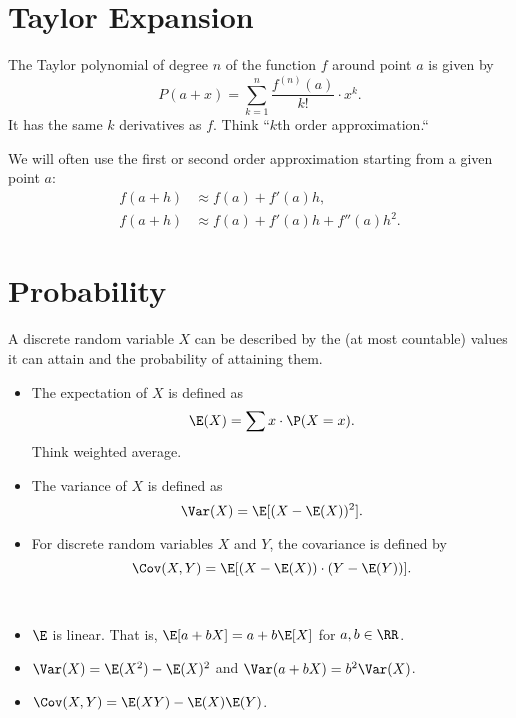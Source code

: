 \documentclass[oneside,reqno,letterpaper]{amsart}
\begin{document}
\section{Taylor Expansion}
\begin{definition}
  The Taylor polynomial of degree \(n\) of the function \(f\) around point \(a\) is given by 
  \[
    P(a + x) = \sum_{k = 1}^{n} \frac{f^{(n)}(a)}{k!} \cdot x^{k} . 
  \] 
  It has the same \(k\) derivatives as \(f\). 
  Think ``\(k\)th order approximation.``
\end{definition}
\begin{remark}
  We will often use the first or second order approximation starting from a given point \(a\):
  \begin{align*}
    f(a + h) &\approx f(a) + f'(a) h, \\
    f(a + h) &\approx f(a) + f'(a) h + f''(a) h^2. 
  \end{align*}
\end{remark}



\section{Probability}
\begin{definition}
  A discrete random variable \(X\) can be described by the (at most countable) values it can attain and the probability of attaining them.

  \begin{itemize}
  \item 
    The expectation of \(X\) is defined as 
    \[
      \E(X) = \sum x \cdot \P(X = x) . 
    \] 
    Think weighted average. 

  \item 
    The variance of \(X\) is defined as 
    \[
      \Var(X) = \E[(X - \E(X))^2] . 
    \] 

  \item For discrete random variables \(X\) and \(Y\), the covariance is defined by
    \[
      \Cov(X, Y) = \E[(X - \E(X)) \cdot (Y - \E(Y))] .
    \] 
  \end{itemize}
\end{definition}

\begin{proposition}~
  \begin{itemize}
    \item \(\E\) is linear. 
      That is, \(\E[a + bX] = a + b \E[X]\) for \(a, b \in \RR\). 
    \item \(\Var(X) = \E(X^2) - \E(X)^2\) and 
      \(\Var(a + bX) = b^2 \Var(X)\). 
    \item \(\Cov(X, Y) = \E(XY) - \E(X) \E(Y)\). 
  \end{itemize}
\end{proposition}
\end{document}
